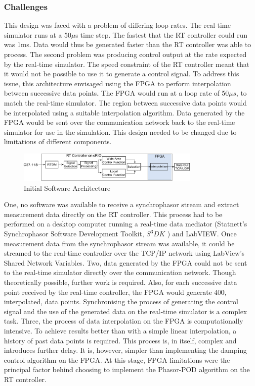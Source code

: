 \documentclass[conference]{IEEEtran}
\begin{document}
\subsubsection*{Challenges} This design was faced with a problem of differing loop rates. The real-time simulator runs at a 50$\mu$s time step. The fastest that the RT controller could run was 1ms. Data would thus be generated faster than the RT controller was able to process. The second problem was producing control output at the rate expected by the real-time simulator. The speed constraint of the RT controller meant that it would not be possible to use it to generate a control signal. To address this issue, this architecture envisaged using the FPGA to perform interpolation between successive data points. The FPGA would run at a loop rate of 50$\mu s$, to match the real-time simulator. The region between successive data points would be interpolated using a suitable interpolation algorithm. Data generated by the FPGA would be sent over the communication network back to the real-time simulator for use in the simulation. This design needed to be changed due to limitations of different components. 
\begin{figure}[htb]
\centering
\includegraphics[width=3.5in]{InitialArch}
\vspace{-0.5em}
\caption{Initial Software Architecture}
\label{fig:InitialArch}
\end{figure}

One, no software was available to receive a synchrophasor stream and extract measurement data directly on the RT controller. This process had to be performed on a desktop computer running a real-time data mediator (Statnett's Synchrophasor Software Development Toolkit, $S^{3}DK$ \cite{SDK}) and LabVIEW. Once measurement data from the synchrophasor stream was available, it could be streamed to the real-time controller over the TCP/IP network using LabView's Shared Network Variables. Two, data generated by the FPGA could not be sent to the real-time simulator directly over the communication network. Though theoretically possible, further work is required. Also, for each successive data point received by the real-time controller, the FPGA would generate 400, interpolated, data points. Synchronising the process of generating the control signal and the use of the generated data on the real-time simulator is a complex task. Three, the process of data interpolation on the FPGA is computationally intensive. To achieve results better than with a simple linear interpolation, a history of past data points is required. This process is, in itself, complex and introduces further delay. It is, however, simpler than implementing the damping control algorithm on the FPGA. At this stage, FPGA limitations were the principal factor behind choosing to implement the Phasor-POD algorithm on the RT controller.
\end{document}
